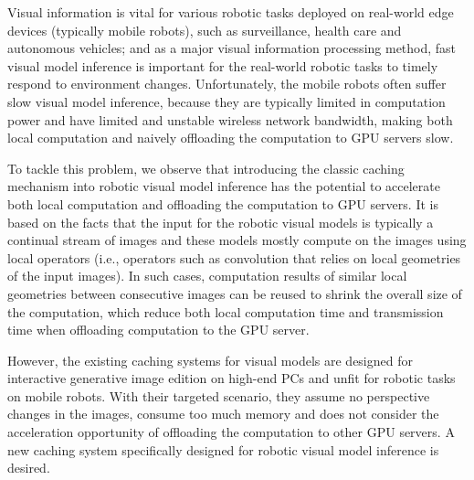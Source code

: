 Visual information is vital for various robotic tasks deployed on real-world edge devices (typically mobile robots), such as surveillance, health care and autonomous vehicles;
and as a major visual information processing method, fast visual model inference is important for the real-world robotic tasks to timely respond to environment changes. 
Unfortunately, the mobile robots often suffer slow visual model inference, because they are typically limited in computation power and have limited and unstable wireless network bandwidth, making both local computation and naively offloading the computation to GPU servers slow.

To tackle this problem, we observe that introducing the classic caching mechanism into robotic visual model inference has the potential to accelerate both local computation and offloading the computation to GPU servers.
It is based on the facts that the input for the robotic visual models is typically a continual stream of images and these models mostly compute on the images using local operators (i.e., operators such as convolution that relies on local geometries of the input images).
In such cases, computation results of similar local geometries between consecutive images can be reused to shrink the overall size of the computation, which reduce both local computation time and transmission time when offloading computation to the GPU server.

However, the existing caching systems for visual models are designed for interactive generative image edition on high-end PCs and unfit for robotic tasks on mobile robots.
With their targeted scenario, they assume no perspective changes in the images, consume too much memory and does not consider the acceleration opportunity of offloading the computation to other GPU servers.
A new caching system specifically designed for robotic visual model inference is desired.




